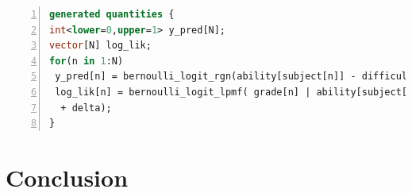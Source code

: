 \begin{lstlisting}[language=Stan,basicstyle=\scriptsize, frame=l,framesep=4.5mm,framexleftmargin=2.5mm,tabsize=2,numbers=left,fillcolor=\color{blueforest!40},rulecolor=\color{blue},numberstyle=\normalfont\tiny\color{white}]
generated quantities {
int<lower=0,upper=1> y_pred[N];
vector[N] log_lik;
for(n in 1:N)
 y_pred[n] = bernoulli_logit_rgn(ability[subject[n]] - difficulty[item[n]] + delta);
 log_lik[n] = bernoulli_logit_lpmf( grade[n] | ability[subject[n]] - difficulty[item[n]]
  + delta);
}
\end{lstlisting}
\section{Conclusion}

